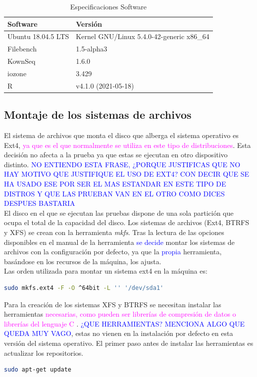 \begin{table}[H]
    \centering
    \begin{tabular}{|l|l|}
    \hline
        Software & Versión \\ \hline\hline
        Ubuntu 18.04.5 LTS & Kernel GNU/Linux 5.4.0-42-generic x86\_64 \\ \hline
        Filebench & 1.5-alpha3 \\ \hline
        KownSeq & 1.6.0 \\ \hline
        iozone & 3.429 \\ \hline
        R & v4.1.0 (2021-05-18) \\ \hline
    \end{tabular}
    \caption{Especificaciones Software}
\label{table:2}
\end{table}

\subsection{Montaje de los sistemas de archivos}
El sistema de archivos que monta el disco que alberga el sistema operativo es Ext4, \textcolor{magenta}{ya que es el que normalmente se utiliza en este tipo de distribuciones}. Esta decisión no afecta a la prueba ya que estas se ejecutan en otro dispositivo distinto. \textcolor{blue}{NO ENTIENDO ESTA FRASE, ¿PORQUE JUSTIFICAS QUE NO HAY MOTIVO QUE JUSTIFIQUE EL USO DE EXT4? CON DECIR QUE SE HA USADO ESE POR SER EL MAS ESTANDAR EN ESTE TIPO DE DISTROS Y QUE LAS PRUEBAN VAN EN EL OTRO COMO DICES DESPUES BASTARIA}  \\

El disco en el que se ejecutan las pruebas dispone de una sola partición que ocupa el total de la capacidad del disco. Los sistemas de archivos (Ext4, BTRFS y XFS) se crean con la herramienta \textit{mkfs}. Tras la lectura de las opciones disponibles en el manual de la herramienta \cite{tso}  \textcolor{blue}{se decide} montar los sistemas de archivos con la configuración por defecto, ya que la \textcolor{blue}{propia} herramienta, basándose en los recursos de la máquina, los ajusta.\\

Las orden utilizada para montar un sistema ext4 en la máquina es:

\begin{lstlisting}[language=bash]
 sudo mkfs.ext4 -F -O ^64bit -L '' '/dev/sda1'
\end{lstlisting}

Para la creación de los sistemas XFS y BTRFS  se necesitan instalar las herramientas \textcolor{magenta}{necesarias, como pueden ser  librerías de compresión de datos o librerías del lenguaje C \cite{lib-ubuntu-btrfs}}. \textcolor{blue}{¿QUE HERRAMIENTAS? MENCIONA ALGO QUE QUEDA MUY VAGO}, estas no vienen en la instalación por defecto en esta versión del sistema operativo. El primer paso antes de instalar las herramientas es actualizar los repositorios.
\begin{lstlisting}[language=bash]
sudo apt-get update
\end{lstlisting}

